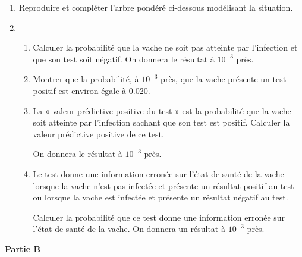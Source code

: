 \begin{enumerate}
	\item Reproduire et compléter l’arbre pondéré ci-dessous modélisant la situation.
	
	\begin{center}
	\end{center}
	\item 
	\begin{enumerate}
		\item Calculer la probabilité que la vache ne soit pas atteinte par l’infection et que son test soit négatif. On donnera le résultat à $10^{-3}$ près.
		\item Montrer que la probabilité, à $10^{-3}$ près, que la vache présente un test positif est environ égale à \num{0,020}.
		\item La « valeur prédictive positive du test » est la probabilité que la vache soit atteinte par l’infection sachant que son test est positif. Calculer la valeur prédictive positive de ce test.
		
		On donnera le résultat à $10^{-3}$ près.
		\item Le test donne une information erronée sur l’état de santé de la vache lorsque la vache n’est pas infectée et présente un résultat positif au test ou lorsque la vache est infectée et présente un résultat négatif au test.
		
		Calculer la probabilité que ce test donne une information erronée sur l’état de santé de la vache. On donnera un résultat à $10^{-3}$ près.
	\end{enumerate}
\end{enumerate}

\medskip

\textbf{Partie B}

\smallskip

